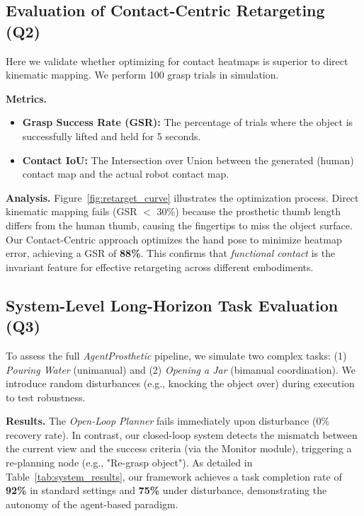 \documentclass[letterpaper, 10 pt, conference]{ieeeconf}  %
\begin{document}
\subsection{Evaluation of Contact-Centric Retargeting (Q2)}
\label{subsec:exp_retargeting}
Here we validate whether optimizing for contact heatmaps is superior to direct kinematic mapping. We perform 100 grasp trials in simulation.

\textbf{Metrics.}
\begin{itemize}
    \item \textbf{Grasp Success Rate (GSR):} The percentage of trials where the object is successfully lifted and held for 5 seconds.
    \item \textbf{Contact IoU:} The Intersection over Union between the generated (human) contact map and the actual robot contact map.
\end{itemize}

\textbf{Analysis.} Figure~\ref{fig:retarget_curve} illustrates the optimization process. Direct kinematic mapping fails (GSR $<$ 30\%) because the prosthetic thumb length differs from the human thumb, causing the fingertips to miss the object surface. Our Contact-Centric approach optimizes the hand pose to minimize heatmap error, achieving a GSR of \textbf{88\%}. This confirms that \textit{functional contact} is the invariant feature for effective retargeting across different embodiments.

\subsection{System-Level Long-Horizon Task Evaluation (Q3)}
\label{subsec:exp_system}
To assess the full \emph{AgentProsthetic} pipeline, we simulate two complex tasks: (1) \textit{Pouring Water} (unimanual) and (2) \textit{Opening a Jar} (bimanual coordination). We introduce random disturbances (e.g., knocking the object over) during execution to test robustness.

\textbf{Results.}
The \textit{Open-Loop Planner} fails immediately upon disturbance (0\% recovery rate). In contrast, our closed-loop system detects the mismatch between the current view and the success criteria (via the Monitor module), triggering a re-planning node (e.g., "Re-grasp object"). 
As detailed in Table~\ref{tab:system_results}, our framework achieves a task completion rate of \textbf{92\%} in standard settings and \textbf{75\%} under disturbance, demonstrating the autonomy of the agent-based paradigm.
\end{document}

